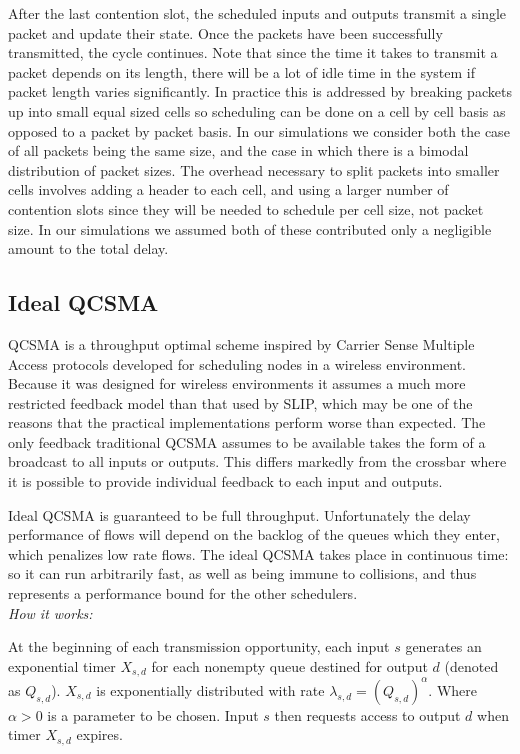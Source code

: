 \documentclass[11pt]{article}%
\begin{document}
After the last contention slot, the scheduled inputs and outputs transmit a single packet and update their state.  Once the packets have been successfully transmitted, the cycle continues.  Note that since the time it takes to transmit a packet depends on its length, there will be a lot of idle time in the system if packet length varies significantly.  In practice this is addressed by breaking packets up into small equal sized cells so scheduling can be done on a cell by cell basis as opposed to a packet by packet basis.  In our simulations we consider both the case of all packets being the same size, and the case in which there is a bimodal distribution of packet sizes.  The overhead necessary to split packets into smaller cells involves adding a header to each cell, and using a larger number of contention slots since they will be needed to schedule per cell size, not packet size.  In our simulations we assumed both of these contributed only a negligible amount to the total delay.

\subsection{Ideal QCSMA}


QCSMA is a throughput optimal scheme inspired by Carrier Sense Multiple Access protocols developed for scheduling nodes in a wireless environment.  Because it was designed for wireless environments it assumes a much more restricted feedback model than that used by SLIP, which may be one of the reasons that the practical implementations perform worse than expected.  The only feedback traditional QCSMA assumes to be available takes the form of a broadcast to all inputs or outputs. This differs markedly from the crossbar where it is possible to provide individual feedback to each input and outputs.%

Ideal QCSMA is guaranteed to be full throughput.  Unfortunately the delay performance of flows will depend on the backlog of the queues which they enter, which penalizes low rate flows.  The ideal QCSMA takes place in continuous time: so it can run arbitrarily fast, as well as being immune to collisions, and thus represents a performance bound for the other schedulers.\\

{\it How it works:}

At the beginning of each transmission opportunity, each input $s$ generates an exponential timer $X_{s,d}$ for each nonempty queue  destined for output $d$ (denoted as $Q_{s,d}$).  $X_{s,d}$ is exponentially distributed with rate $\lambda_{s,d} = (Q_{s,d})^{\alpha}$.  Where $\alpha > 0$ is a parameter to be chosen.  Input $s$ then requests access to output $d$ when timer $X_{s,d}$ expires. \\ %
\end{document}
